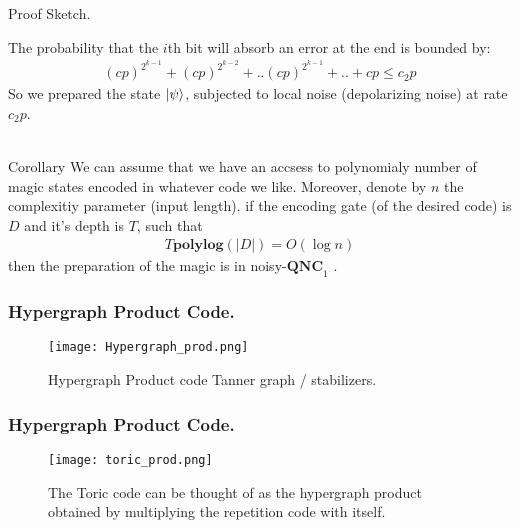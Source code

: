 \documentclass{beamer}
\newcommand*{\QNCon}{ \mathbf{QNC}_{1} }
\newcommand*{\noiseQNCon}{ noisy-$\QNCon$ }
\begin{document}
\begin{frame}{Proof Sketch.}

The probability that the $i$th bit will absorb an error at the end is bounded by:
  \begin{equation*}
    \begin{split}
      \left( cp \right)^{2^{k-1}} + \left( cp \right)^{2^{k-2}} + .. \left( cp \right)^{2^{k-1}} + .. +  cp \le c_{2}p 
    \end{split}
  \end{equation*}
So we prepared the state $\ket{\psi}$, subjected to local noise (depolarizing noise) at rate $c_{2}p$. \\~\

\begin{block}{Corollary}
  We can assume that we have an accsess to polynomialy number of magic states encoded in whatever code we like.
  Moreover, denote by $n$ the complexitiy parameter (input length). if the encoding gate (of the desired code) is $D$ and it's depth is $T$, such that 
  \begin{equation*}
    \begin{split}
      T \mathbf{poly log} \left( |D| \right) = O(\log n)
    \end{split}
  \end{equation*}
  then the preparation of the magic is in\noiseQNCon.
\end{block}

\end{frame}

\begin{frame}
  \frametitle{Hypergraph Product Code.}
\begin{figure}[h]
    \centering
    \texttt{[image: Hypergraph\_prod.png]}
    \caption{ Hypergraph Product code Tanner graph / stabilizers. }
    \label{fig:your-label}
\end{figure}

\end{frame}

\begin{frame}
  \frametitle{Hypergraph Product Code.}

\begin{figure}[h]
    \centering
    \texttt{[image: toric\_prod.png]}
    \caption{The Toric code can be thought of as the hypergraph product obtained by multiplying the repetition code with itself.}
    \label{fig:your-label}
\end{figure}

\end{frame}
\end{document}
